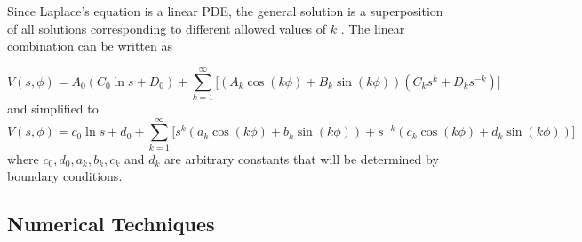 \documentclass[a4paper]{jpconf}
\begin{document}


Since Laplace's equation is a linear PDE, the general solution is a superposition of all solutions corresponding to different allowed values of $k$ \cite{griffiths-introElec}. The linear combination can be written as

\begin{equation}
V(s, \phi) = A_0 (C_0 \ln{s} + D_0) + \sum_{k=1}^{\infty} \big[(A_k \cos{(k\phi)} + B_k \sin{(k\phi)}) (C_k s^k + D_k s^{-k})\big]
\label{eq:gs1}
\end{equation}
\noindent and simplified to
\begin{equation}
V(s, \phi) = c_0 \ln{s} + d_0 + \sum_{k=1}^{\infty} \big[ s^k (a_k \cos{(k\phi)} + b_k \sin{(k\phi)}) + s^{-k}(c_k \cos{(k\phi)} + d_k \sin{(k\phi)})\big]
\label{eq:gs2}
\end{equation}
\noindent where $c_0, d_0, a_k, b_k, c_k$ and $d_k$ are arbitrary constants that will be determined by boundary conditions. 
\\ \par 

\subsection*{Numerical Techniques}
\end{document}
